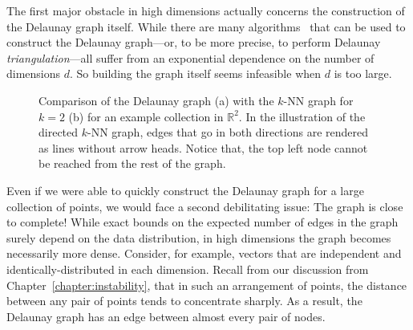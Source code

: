 The first major obstacle in high dimensions actually concerns
the construction of the Delaunay graph itself. While there are many
algorithms~\citep{edelsbrunner1992delaunay,guibas1992delaunay,guibas1985voronoi}
that can be used to construct the Delaunay graph---or, to be more precise,
to perform Delaunay \emph{triangulation}---all suffer from an exponential dependence
on the number of dimensions $d$. So building the graph itself seems infeasible when $d$
is too large.

\begin{figure}[t]
    \centering
    \caption{Comparison of the Delaunay graph (a) with the $k$-NN graph for $k=2$ (b)
    for an example collection in $\mathbb{R}^2$.
    In the illustration of the directed $k$-NN graph, edges that go in both directions
    are rendered as lines without arrow heads.
    Notice that, the top left node cannot be reached from the rest
    of the graph.}
    \label{figure:graphs:knn-graph}
\end{figure}

Even if we were able to quickly construct the Delaunay graph for a large collection of
points, we would face a second debilitating issue: The graph is close to complete!
While exact bounds on the expected number of edges in the graph surely depend on the data
distribution, in high dimensions the graph becomes necessarily more dense.
Consider, for example, vectors that are independent and identically-distributed
in each dimension. Recall from our discussion from Chapter~\ref{chapter:instability},
that in such an arrangement of points, the distance between any pair of points tends to
concentrate sharply. As a result, the Delaunay graph has an edge between almost every
pair of nodes.

